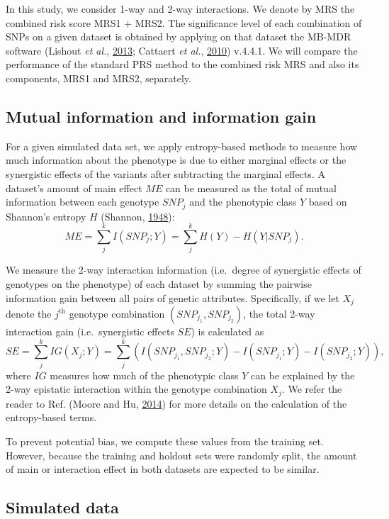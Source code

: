 \documentclass{ws-procs11x85}
\begin{document}
In this study, we consider 1-way and 2-way interactions. We denote by
MRS the combined risk score MRS1 + MRS2. The significance level of each
combination of SNPs on a given dataset is obtained by applying on that
dataset the MB-MDR software (Lishout \emph{et al.},
\protect\hyperlink{ref-S6nj6BFK}{2013}; Cattaert \emph{et al.},
\protect\hyperlink{ref-16AnEAMje}{2010}) v.4.4.1. We will compare the
performance of the standard PRS method to the combined risk MRS and also
its components, MRS1 and MRS2, separately.

\subsection{Mutual information and information
gain}\label{mutual-information-and-information-gain}

For a given simulated data set, we apply entropy-based methods to
measure how much information about the phenotype is due to either
marginal effects or the synergistic effects of the variants after
subtracting the marginal effects. A dataset's amount of main effect
\(ME\) can be measured as the total of mutual information between each
genotype \(SNP_j\) and the phenotypic class \(Y\) based on Shannon's
entropy \(H\) (Shannon, \protect\hyperlink{ref-yzGboP1g}{1948}):
\[ME = \sum_{j}^k I(SNP_j; Y) = \sum_{j}^k H(Y) - H(Y|SNP_j).\]

We measure the 2-way interaction information (i.e.~degree of synergistic
effects of genotypes on the phenotype) of each dataset by summing the
pairwise information gain between all pairs of genetic attributes.
Specifically, if we let \(X_j\) denote the \(j^\textrm{th}\) genotype
combination \((SNP_{j_1}, SNP_{j_2})\), the total 2-way interaction gain
(i.e.~synergistic effects \(SE\)) is calculated as
\[SE = \sum_{j}^kIG(X_j; Y) = \sum_{j}^k \left(I(SNP_{j_1}, SNP_{j_2}; Y) - I(SNP_{j_1}; Y) - I(SNP_{j_2}; Y)\right),\]
where \(IG\) measures how much of the phenotypic class \(Y\) can be
explained by the 2-way epistatic interaction within the genotype
combination \(X_j\). We refer the reader to Ref. (Moore and Hu,
\protect\hyperlink{ref-1FFMLUZxb}{2014}) for more details on the
calculation of the entropy-based terms.

To prevent potential bias, we compute these values from the training set.
However, because the training and holdout sets were randomly split, the amount of main or interaction effect in both datasets are expected to be similar.

\subsection{Simulated data}\label{simulated-data}
\end{document}
